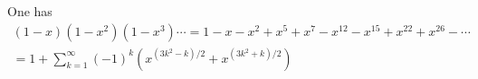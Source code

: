 

\setcounter{section}{3}
\setcounter{subsection}{8}
\setcounter{dfn}{19}

\begin{thm}[Euler]
\label{thm:EulerPenta}
One has
\begin{multline*}
(1-x)(1-x^2)(1-x^3) \cdots = 1 - x - x^2 + x^5 + x^7 - x^{12} - x^{15} + x^{22} + x^{26} - \cdots\\
= 1 + \sum_{k=1}^{\infty} (-1)^k (x^{(3k^2-k)/2} + x^{(3k^2+k)/2})
\end{multline*}
\end{thm}


